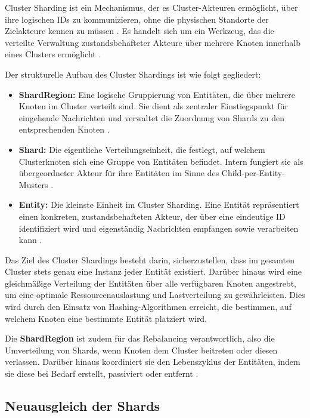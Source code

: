 Cluster Sharding ist ein Mechanismus, der es Cluster-Akteuren ermöglicht, über ihre logischen IDs zu kommunizieren, ohne die physischen Standorte der Zielakteure kennen zu müssen \parencite{getakka_cluster_sharding}.  
Es handelt sich um ein Werkzeug, das die verteilte Verwaltung zustandsbehafteter Akteure über mehrere Knoten innerhalb eines Clusters ermöglicht \parencite{cluster_sharding_petabridge}.  

Der strukturelle Aufbau des Cluster Shardings ist wie folgt gegliedert:

\begin{itemize}
    \item \textbf{ShardRegion:}
    Eine logische Gruppierung von Entitäten, die über mehrere Knoten im Cluster verteilt sind. Sie dient als zentraler Einstiegspunkt für eingehende Nachrichten und verwaltet die Zuordnung von Shards zu den entsprechenden Knoten \parencite{cluster_sharding_petabridge}.
    \item \textbf{Shard:}
    Die eigentliche Verteilungseinheit, die festlegt, auf welchem Clusterknoten sich eine Gruppe von Entitäten befindet. Intern fungiert sie als übergeordneter Akteur für ihre Entitäten im Sinne des Child-per-Entity-Musters \parencite{cluster_sharding_petabridge}.
    \item \textbf{Entity:}
    Die kleinste Einheit im Cluster Sharding. Eine Entität repräsentiert einen konkreten, zustandsbehafteten Akteur, der über eine eindeutige ID identifiziert wird und eigenständig Nachrichten empfangen sowie verarbeiten kann \parencite{cluster_sharding_petabridge}.
\end{itemize}

Das Ziel des Cluster Shardings besteht darin, sicherzustellen, dass im gesamten Cluster stets genau eine Instanz jeder Entität existiert.  
Darüber hinaus wird eine gleichmäßige Verteilung der Entitäten über alle verfügbaren Knoten angestrebt, um eine optimale Ressourcenauslastung und Lastverteilung zu gewährleisten.  
Dies wird durch den Einsatz von Hashing-Algorithmen erreicht, die bestimmen, auf welchem Knoten eine bestimmte Entität platziert wird.  

Die \textbf{ShardRegion} ist zudem für das Rebalancing verantwortlich, also die Umverteilung von Shards, wenn Knoten dem Cluster beitreten oder diesen verlassen.  
Darüber hinaus koordiniert sie den Lebenszyklus der Entitäten, indem sie diese bei Bedarf erstellt, passiviert oder entfernt \parencite{cluster_sharding_petabridge}.

\subsection{Neuausgleich der Shards}

